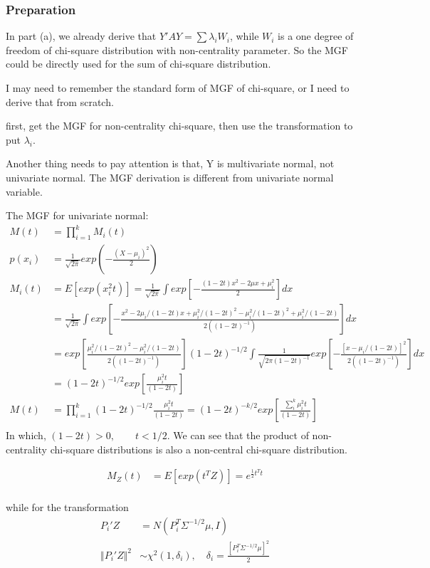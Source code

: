 \subsubsection{Preparation}	
In part (a), we already derive that $Y'AY = \sum \lambda_i W_i$, while $W_i$ is a one degree of freedom of chi-square distribution with non-centrality parameter. So the MGF could be directly used for the sum of chi-square distribution. 

I may need to remember the standard form of MGF of chi-square, or I need to derive that from scratch.

first, get the MGF for non-centrality chi-square, then use the transformation to put $\lambda_i$.

Another thing needs to pay attention is that, Y is multivariate normal, not univariate normal. The MGF derivation is different from univariate normal variable. 

The MGF for univariate normal:
	\begin{align*}
	M(t) &= \prod_{i=1}^k M_i(t) \\
	p(x_i) &= \frac{1}{\sqrt{2\pi}} exp(-\frac{(X-\mu_i)^2}{2})\\
	M_i(t)	&= E[exp(x_i^2 t)]= \frac{1}{\sqrt{2\pi}} \int exp[- \frac{(1-2t)x^2 - 2\mu x + \mu_i^2}{2}] dx\\
	&= \frac{1}{\sqrt{2\pi}} \int  exp[- \frac{x^2 - 2\mu_i/(1-2t) x + \mu_i^2/(1-2t)^2 - \mu_i^2/(1-2t)^2 + \mu_i^2/(1-2t)}{2 ((1-2t)^{-1})}] dx\\
	&= exp[\frac{\mu_i^2/(1-2t)^2 - \mu_i^2/(1-2t)}{2 ((1-2t)^{-1})}] (1-2t)^{-1/2} \int \frac{1}{\sqrt{2\pi (1-2t)^{-1}}} exp[- \frac{[x- \mu_i/(1-2t)]^2}{2 ((1-2t)^{-1})}] dx\\
	&= (1-2t)^{-1/2} exp[\frac{\mu_i^2 t}{(1-2t)}]\\
	M(t) &= \prod_{i=1}^k (1-2t)^{-1/2} \frac{\mu_i^2 t}{(1-2t)} = (1-2t)^{-k/2} exp[\frac{\sum_i^k \mu_i^2 t}{(1-2t)}] \\
\end{align*}  
In which, $(1-2t) > 0, \qquad t< 1/2$. We can see that the product of non-centrality chi-square distributions is also a non-central chi-square distribution.


 \begin{align*}
 	M_Z(t)	&= E[ exp(t^T Z) ]=  e^{\frac{1}{2} t^T t} \\
 \end{align*}  

while for the transformation 
\begin{align*}
	P_i' Z &=  N( P_i^T \Sigma^{-1/2} \mu, I )\\
	\Vert P_i' Z \Vert^2  & \sim \chi^2 (1, \delta_i), \quad  \delta_i = \frac{[P_i^T \Sigma^{-1/2} \mu]^2}{2} 
\end{align*} 

